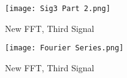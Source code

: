\documentclass[12pt]{report}
\begin{document}
\begin{figure}[h!]
    \centering
    \texttt{[image: Sig3 Part 2.png]}
    \caption{New FFT, Third Signal}
    \label{Figure x:}
\end{figure}
\begin{figure}[h!]
    \centering
    \texttt{[image: Fourier Series.png]}
    \caption{New FFT, Third Signal}
    \label{Figure x:}
\end{figure}
\\\\\\\\\\\\\\\\\\\\\\\\\\\\\\\\\\\\\\\
\end{document}
